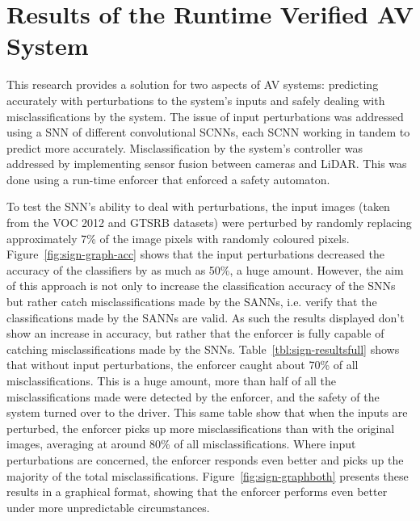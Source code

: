\section{Results of the Runtime Verified AV System}

This research provides a solution for two aspects of \acf{AV} systems: predicting accurately with perturbations to the system's inputs and safely dealing with misclassifications by the system.
The issue of input perturbations was addressed using a \acf{SNN} of different convolutional \acfp{SCNN}, each \ac{SCNN} working in tandem to predict more accurately.
Misclassification by the system's controller was addressed by implementing sensor fusion between cameras and \ac{LiDAR}.
This was done using a run-time enforcer that enforced a safety automaton.

To test the \ac{SNN}'s ability to deal with perturbations, the input images (taken from the \ac{VOC} 2012 and \ac{GTSRB} datasets) were perturbed by randomly replacing approximately 7\% of the image pixels with randomly coloured pixels.
Figure~\ref{fig:sign-graph-acc} shows that the input perturbations decreased the accuracy of the classifiers by as much as 50\%, a huge amount.
However, the aim of this approach is not only to increase the classification accuracy of the \acp{SNN} but rather catch misclassifications made by the \acp{SANN}, i.e. verify that the classifications made by the \acp{SANN} are valid.
As such the results displayed don't show an increase in accuracy, but rather that the enforcer is fully capable of catching misclassifications made by the \acp{SNN}.
Table~\ref{tbl:sign-resultsfull} shows that without input perturbations, the enforcer caught about 70\% of all misclassifications. 
This is a huge amount, more than half of all the misclassifications made were detected by the enforcer, and the safety of the system turned over to the driver.
This same table show that when the inputs are perturbed, the enforcer picks up more misclassifications than with the original images, averaging at around 80\% of all misclassifications.
Where input perturbations are concerned, the enforcer responds even better and picks up the majority of the total misclassifications.
Figure~\ref{fig:sign-graphboth} presents these results in a graphical format, showing that the enforcer performs even better under more unpredictable circumstances.


